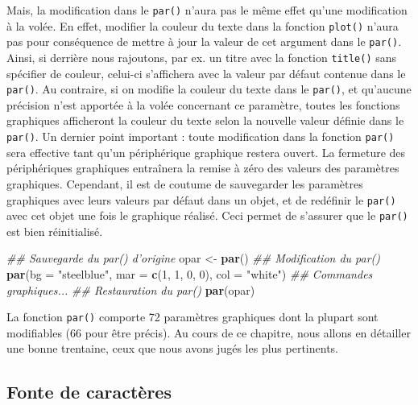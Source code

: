 \documentclass[]{article}
\newenvironment{Shaded}{\begin{snugshade}}{\end{snugshade}}
\newcommand{\CommentTok}[1]{\textcolor[rgb]{0.56,0.35,0.01}{\textit{#1}}}
\newcommand{\DataTypeTok}[1]{\textcolor[rgb]{0.13,0.29,0.53}{#1}}
\newcommand{\DecValTok}[1]{\textcolor[rgb]{0.00,0.00,0.81}{#1}}
\newcommand{\KeywordTok}[1]{\textcolor[rgb]{0.13,0.29,0.53}{\textbf{#1}}}
\newcommand{\NormalTok}[1]{#1}
\newcommand{\StringTok}[1]{\textcolor[rgb]{0.31,0.60,0.02}{#1}}
\begin{document}
Mais, la modification dans le \texttt{par()} n'aura pas le même effet qu'une modification à la volée. En effet, modifier la couleur du texte dans la fonction \texttt{plot()} n'aura pas pour conséquence de mettre à jour la valeur de cet argument dans le \texttt{par()}. Ainsi, si derrière nous rajoutons, par ex. un titre avec la fonction \texttt{title()} sans spécifier de couleur, celui-ci s'affichera avec la valeur par défaut contenue dans le \texttt{par()}. Au contraire, si on modifie la couleur du texte dans le \texttt{par()}, et qu'aucune précision n'est apportée à la volée concernant ce paramètre, toutes les fonctions graphiques afficheront la couleur du texte selon la nouvelle valeur définie dans le \texttt{par()}.
Un dernier point important : toute modification dans la fonction \texttt{par()} sera effective tant qu'un périphérique graphique restera ouvert. La fermeture des périphériques graphiques entraînera la remise à zéro des valeurs des paramètres graphiques. Cependant, il est de coutume de sauvegarder les paramètres graphiques avec leurs valeurs par défaut dans un objet, et de redéfinir le \texttt{par()} avec cet objet une fois le graphique réalisé. Ceci permet de s'assurer que le \texttt{par()} est bien réinitialisé.

\begin{Shaded}
\begin{Highlighting}[]
\CommentTok{## Sauvegarde du par() d'origine}
\NormalTok{opar <-}\StringTok{ }\KeywordTok{par}\NormalTok{()}
\CommentTok{## Modification du par()}
\KeywordTok{par}\NormalTok{(}\DataTypeTok{bg =} \StringTok{"steelblue"}\NormalTok{, }\DataTypeTok{mar =} \KeywordTok{c}\NormalTok{(}\DecValTok{1}\NormalTok{, }\DecValTok{1}\NormalTok{, }\DecValTok{0}\NormalTok{, }\DecValTok{0}\NormalTok{), }\DataTypeTok{col =} \StringTok{"white"}\NormalTok{)}
\CommentTok{## Commandes graphiques...}
\CommentTok{## Restauration du par()}
\KeywordTok{par}\NormalTok{(opar)}
\end{Highlighting}
\end{Shaded}

La fonction \texttt{par()} comporte 72 paramètres graphiques dont la plupart sont modifiables (66 pour être précis). Au cours de ce chapitre, nous allons en détailler une bonne trentaine, ceux que nous avons jugés les plus pertinents.

\hypertarget{fonte-de-caractuxe8res}{%
\subsection{Fonte de caractères}\label{fonte-de-caractuxe8res}}
\end{document}
